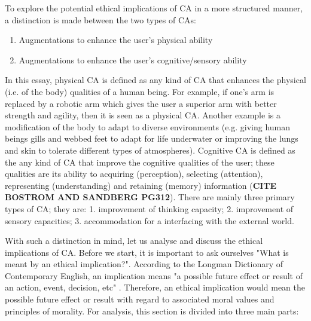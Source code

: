 To explore the potential ethical implications of CA in a more structured manner, a distinction is made between the two types of CAs: 
\begin{enumerate}
	\item Augmentations to enhance the user's physical ability
	\item Augmentations to enhance the user's cognitive/sensory ability
\end{enumerate}

In this essay, physical CA is defined as any kind of CA that enhances the physical (i.e. of the body) qualities of a human being. For example, if one's arm is replaced by a robotic arm which gives the user a superior arm with better strength and agility, then it is seen as a physical CA. Another example is a modification of the body to adapt to diverse environments (e.g. giving human beings gills and webbed feet to adapt for life underwater or improving the lungs and skin to tolerate different types of atmospheres). Cognitive CA is defined as the any kind of CA that improve the cognitive qualities of the user; these qualities are its ability to acquiring (perception), selecting (attention), representing (understanding) and retaining (memory) information ({\bf CITE BOSTROM AND SANDBERG PG312}). There are mainly three primary types of CA; they are: 1. improvement of thinking capacity; 2. improvement of sensory capacities; 3. accommodation for a interfacing with the external world. 


With such a distinction in mind, let us analyse and discuss the ethical implications of CA. Before we start, it is important to ask ourselves "What is meant by an ethical implication?". According to the Longman Dictionary of Contemporary English, an implication means "a possible future effect or result of an action, event, decision, etc" \cite{Longman_dic}. Therefore, an ethical implication would mean the possible future effect or result with regard to associated moral values and principles of morality. For analysis, this section is divided into three main parts: 

